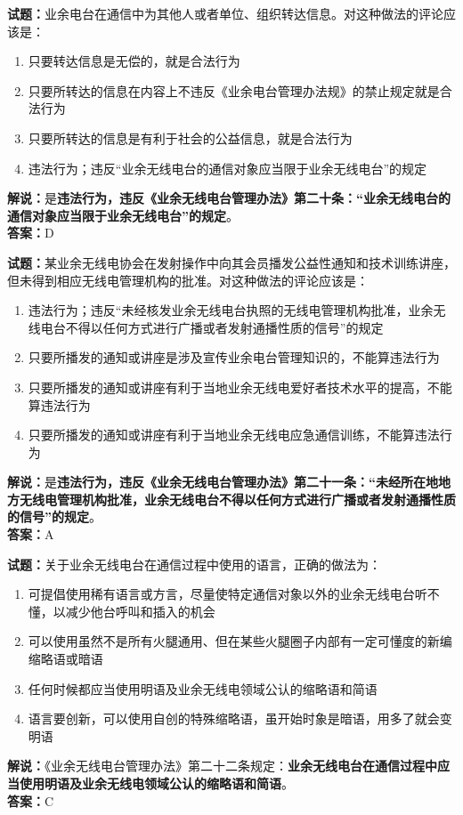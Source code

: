 \documentclass{ctexbook}
\begin{document}
\vspace{\baselineskip}

\noindent\textbf{试题：}业余电台在通信中为其他人或者单位、组织转达信息。对这种做法的评论应该是：
\begin{enumerate}[leftmargin=3em]
  \item 只要转达信息是无偿的，就是合法行为
  \item 只要所转达的信息在内容上不违反《业余电台管理办法规》的禁止规定就是合法行为
  \item 只要所转达的信息是有利于社会的公益信息，就是合法行为
  \item 违法行为；违反“业余无线电台的通信对象应当限于业余无线电台”的规定
\end{enumerate}
\noindent\textbf{解说：}是\textbf{违法行为，违反《业余无线电台管理办法》第二十条：“业余无线电台的通信对象应当限于业余无线电台”的规定}。\\\noindent\textbf{答案：}D

\vspace{\baselineskip}

\noindent\textbf{试题：}某业余无线电协会在发射操作中向其会员播发公益性通知和技术训练讲座，但未得到相应无线电管理机构的批准。对这种做法的评论应该是：
\begin{enumerate}[leftmargin=3em]
  \item 违法行为；违反“未经核发业余无线电台执照的无线电管理机构批准，业余无线电台不得以任何方式进行广播或者发射通播性质的信号”的规定
  \item 只要所播发的通知或讲座是涉及宣传业余电台管理知识的，不能算违法行为
  \item 只要所播发的通知或讲座有利于当地业余无线电爱好者技术水平的提高，不能算违法行为
  \item 只要所播发的通知或讲座有利于当地业余无线电应急通信训练，不能算违法行为
\end{enumerate}
\noindent\textbf{解说：}是\textbf{违法行为，违反《业余无线电台管理办法》第二十一条：“未经所在地地方无线电管理机构批准，业余无线电台不得以任何方式进行广播或者发射通播性质的信号”的规定}。\\\noindent\textbf{答案：}A

\vspace{\baselineskip}

\noindent\textbf{试题：}关于业余无线电台在通信过程中使用的语言，正确的做法为：
\begin{enumerate}[leftmargin=3em]
  \item 可提倡使用稀有语言或方言，尽量使特定通信对象以外的业余无线电台听不懂，以减少他台呼叫和插入的机会
  \item 可以使用虽然不是所有火腿通用、但在某些火腿圈子内部有一定可懂度的新编缩略语或暗语
  \item 任何时候都应当使用明语及业余无线电领域公认的缩略语和简语
  \item 语言要创新，可以使用自创的特殊缩略语，虽开始时象是暗语，用多了就会变明语
\end{enumerate}
\noindent\textbf{解说：}《业余无线电台管理办法》第二十二条规定：\textbf{业余无线电台在通信过程中应当使用明语及业余无线电领域公认的缩略语和简语}。\\\noindent\textbf{答案：}C
\end{document}
